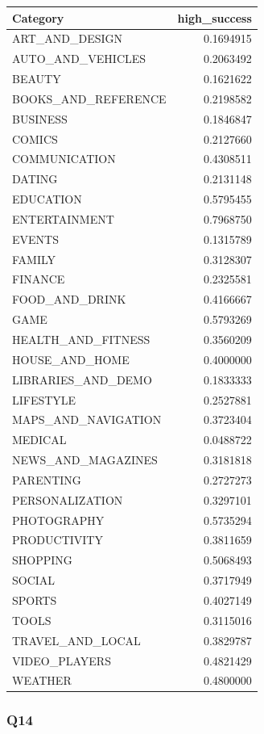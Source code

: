 \documentclass[
]{article}
\newcounter{none} %
\begin{document}
{\def\LTcaptype{none} %
\begin{longtable}[]{@{}lr@{}}
\toprule\noalign{}
Category & high\_success \\
\midrule\noalign{}
\endhead
\bottomrule\noalign{}
\endlastfoot
ART\_AND\_DESIGN & 0.1694915 \\
AUTO\_AND\_VEHICLES & 0.2063492 \\
BEAUTY & 0.1621622 \\
BOOKS\_AND\_REFERENCE & 0.2198582 \\
BUSINESS & 0.1846847 \\
COMICS & 0.2127660 \\
COMMUNICATION & 0.4308511 \\
DATING & 0.2131148 \\
EDUCATION & 0.5795455 \\
ENTERTAINMENT & 0.7968750 \\
EVENTS & 0.1315789 \\
FAMILY & 0.3128307 \\
FINANCE & 0.2325581 \\
FOOD\_AND\_DRINK & 0.4166667 \\
GAME & 0.5793269 \\
HEALTH\_AND\_FITNESS & 0.3560209 \\
HOUSE\_AND\_HOME & 0.4000000 \\
LIBRARIES\_AND\_DEMO & 0.1833333 \\
LIFESTYLE & 0.2527881 \\
MAPS\_AND\_NAVIGATION & 0.3723404 \\
MEDICAL & 0.0488722 \\
NEWS\_AND\_MAGAZINES & 0.3181818 \\
PARENTING & 0.2727273 \\
PERSONALIZATION & 0.3297101 \\
PHOTOGRAPHY & 0.5735294 \\
PRODUCTIVITY & 0.3811659 \\
SHOPPING & 0.5068493 \\
SOCIAL & 0.3717949 \\
SPORTS & 0.4027149 \\
TOOLS & 0.3115016 \\
TRAVEL\_AND\_LOCAL & 0.3829787 \\
VIDEO\_PLAYERS & 0.4821429 \\
WEATHER & 0.4800000 \\
\end{longtable}
}

\subsubsection{Q14}\label{q14}
\end{document}
